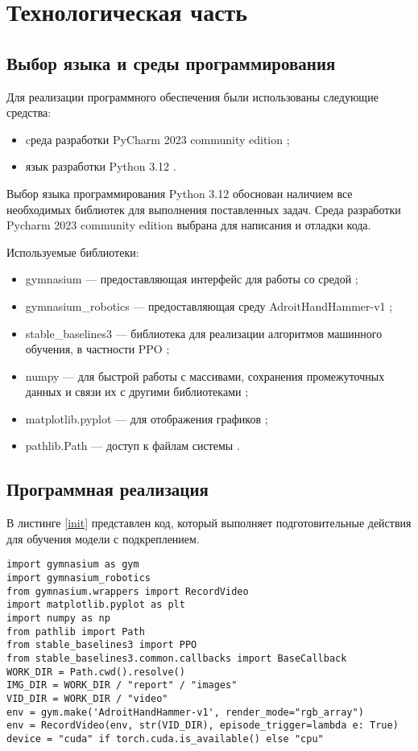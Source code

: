 \chapter{Технологическая часть}

\section{Выбор языка и среды программирования}
Для реализации программного обеспечения были использованы следующие средства:

\begin{itemize}
    \item cреда разработки PyCharm 2023 community edition \cite{lib:pycharm};
    \item язык разработки Python 3.12 \cite{lib:python}.
\end{itemize}

Выбор языка программирования Python 3.12 обоснован наличием все необходимых библиотек для выполнения поставленных задач.
Среда разработки Pycharm 2023 community edition выбрана для написания и отладки кода.
	
Используемые библиотеки:
\begin{itemize}
    \item gymnasium — предоставляющая интерфейс для работы со средой \cite{lib:gymnasium};
    \item gymnasium\_robotics — предоставляющая среду AdroitHandHammer-v1 \cite{lib:gymnasium_robotics};
    \item stable\_baselines3 — библиотека для реализации алгоритмов машинного обучения, в частности PPO \cite{lib:stable_baselines3};
    \item numpy — для быстрой работы с массивами, сохранения промежуточных данных и связи их с другими библиотеками \cite{lib:numpy};
    \item matplotlib.pyplot — для отображения графиков \cite{lib:matplotlib};
    \item pathlib.Path — доступ к файлам системы \cite{lib:pathlib}.
\end{itemize}

\section{Программная реализация}

В листинге \ref{init} представлен код, который выполняет подготовительные действия для обучения модели с подкреплением.

\begin{lstlisting}[label=init, caption={Инициализация}]
import gymnasium as gym
import gymnasium_robotics
from gymnasium.wrappers import RecordVideo
import matplotlib.pyplot as plt
import numpy as np
from pathlib import Path
from stable_baselines3 import PPO
from stable_baselines3.common.callbacks import BaseCallback
WORK_DIR = Path.cwd().resolve()
IMG_DIR = WORK_DIR / "report" / "images"
VID_DIR = WORK_DIR / "video"
env = gym.make('AdroitHandHammer-v1', render_mode="rgb_array")
env = RecordVideo(env, str(VID_DIR), episode_trigger=lambda e: True)
device = "cuda" if torch.cuda.is_available() else "cpu"
\end{lstlisting}

